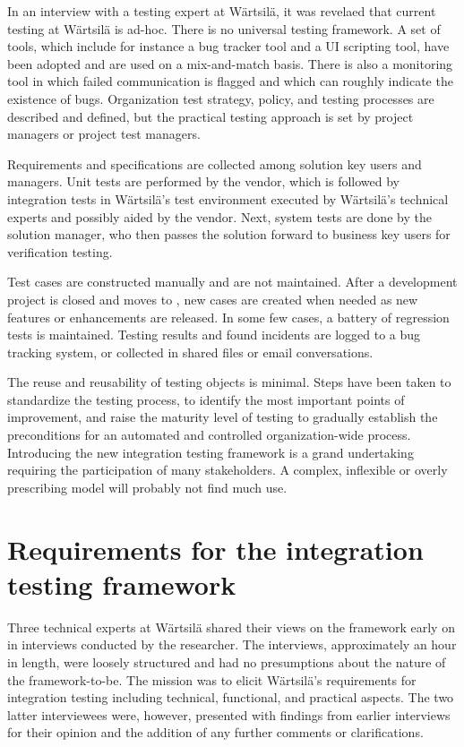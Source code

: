 \documentclass[12pt,a4paper,oneside,pdftex]{report}
\begin{document}
In an interview with a testing expert at Wärtsilä, it was revelaed that current testing at Wärtsilä is ad-hoc. There is no universal testing framework. A set of tools, which include for instance a bug tracker tool and a UI scripting tool, have been adopted and are used on a mix-and-match basis. There is also a monitoring tool in which failed communication is flagged and which can roughly indicate the existence of bugs. Organization test strategy, policy, and testing processes are described and defined, but the practical testing approach is set by project managers or project test managers.

Requirements and specifications are collected among solution key users and managers. Unit tests are performed by the vendor, which is followed by integration tests in Wärtsilä's test environment executed by Wärtsilä's technical experts and possibly aided by the vendor. Next, system tests are done by the solution manager, who then passes the solution forward to business key users for verification testing. %

Test cases are constructed manually and are not maintained. After a development project is closed and moves to , new cases are created when needed as new features or enhancements are released. In some few cases, a battery of regression tests is maintained. Testing results and found incidents are logged to a bug tracking system, or collected in shared files or email conversations. 

The reuse and reusability of testing objects is minimal. Steps have been taken to standardize the testing process, to identify the most important points of improvement, and raise the maturity level of testing to gradually establish the preconditions for an automated and controlled organization-wide process. Introducing the new integration testing framework is a grand undertaking requiring the participation of many stakeholders. A complex, inflexible or overly prescribing model will probably not find much use.


\section{Requirements for the integration testing framework}  

Three technical experts at Wärtsilä shared their views on the framework early on in interviews conducted by the researcher. The interviews, approximately an hour in length, were loosely structured and had no presumptions about the nature of the framework-to-be. The mission was to elicit Wärtsilä's requirements for integration testing including technical, functional, and practical aspects. The two latter interviewees were, however, presented with findings from earlier interviews for their opinion and the addition of any further comments or clarifications.
\end{document}
